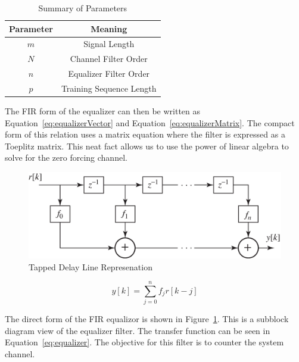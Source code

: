 \documentclass[]{article}
\begin{document}
\begin{table}[b]
\begin{center}
\begin{tabular}{|c|c|}
\hline Parameter & Meaning \\
\hline \hline
$m$ & Signal Length \\ \hline
$N$ & Channel Filter Order \\ \hline
$n$ & Equalizer Filter Order \\ \hline
$p$ & Training Sequence Length \\ \hline
\end{tabular}
\caption{Summary of Parameters} \label{tab:Paramsummary}
\end{center}
\end{table}

The FIR form of the equalizer can then be written as Equation~\ref{eq:equalizerVector} and Equation~\ref{eq:equalizerMatrix}.  The compact form of this relation uses a matrix equation where the filter is expressed as a Toeplitz matrix.  This neat fact allows us to use the power of linear algebra to solve for the zero forcing channel.  
  
 
\begin{figure}[H]
\centering
\includegraphics[width=.6\textwidth]{tapEqualizer.png}
\caption{Tapped Delay Line Represenation\label{fig:tap}}
\end{figure}

\begin{equation}
\label{eq:equalizer}
y\left[k\right] = \sum_{j=0}^n f_jr\left[k-j\right]
\end{equation}

The direct form of the FIR equalizor is shown in Figure~\ref{fig:tap}.  This is a subblock diagram view of the equalizer filter.  The transfer function can be seen in Equation~\ref{eq:equalizer}.  The objective for this filter is to counter the system channel.  \\
\end{document}
